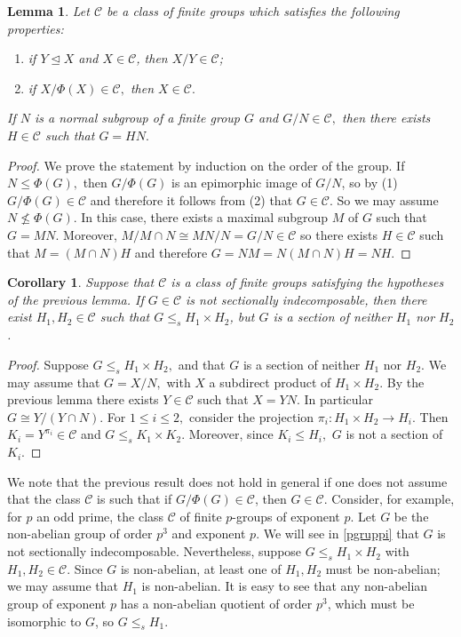 \documentclass[a4paper,10pt]{amsart}
\theoremstyle{plain}
\newtheorem{corollary}[thm]{Corollary}
\newtheorem{lemma}[thm]{Lemma}
\theoremstyle{definition}
\begin{document}
\begin{lemma}\label{class}Let $\mathcal C$ be a class of finite groups which satisfies the following properties:
	\begin{enumerate}
		\item if $Y \unlhd X$ and $X \in \mathcal{C}$, then $X/Y \in \mathcal{C}$;
		\item if $X/\Phi(X)\in \mathcal C,$ then $X\in \mathcal C.$
	\end{enumerate}
	If $N$ is a normal subgroup of a finite group $G$ and $G/N\in \mathcal C,$ then there exists $H\in \mathcal C$ such that $G=HN.$
\end{lemma}
\begin{proof}
	We prove the statement by induction on the order of the group. If $N\leq \Phi(G),$ then $G/\Phi(G)$ is an epimorphic image of $G/N$, so
	by (1) $G/\Phi(G) \in \mathcal C$ and therefore it follows from (2)
	that $G\in \mathcal C.$
	So we may assume $N\not\leq \Phi(G).$ In this case, there exists a maximal subgroup $M$ of $G$ such that $G=MN.$ Moreover, $M/M\cap N \cong MN/N= G/N \in  \mathcal C$ so there exists $H\in \mathcal C$ such that
	$M=(M\cap N)H$ and therefore $G=NM=N(M\cap N)H=NH.$
\end{proof}

\begin{corollary}Suppose that $\mathcal{C}$ is a class of finite groups satisfying the 
hypotheses of the previous lemma. If $G \in \mathcal{C}$ is not sectionally
indecomposable, then there exist $H_1, H_2 \in \mathcal{C}$ such that 
$G \leq_s H_1 \times H_2$, but $G$ is a section of neither $H_1$ nor $H_2$.
\end{corollary}

\begin{proof}Suppose $G\leq_s H_1\times H_2,$ and that $G$ is a section  of neither $H_1$ nor $H_2.$ We may assume that $G=X/N,$ with $X$ a subdirect product of $H_1\times H_2.$ By the previous lemma there exists $Y\in \mathcal C$ such that $X=YN$. In particular $G\cong Y/(Y\cap N).$ For $1\leq i\leq 2,$ consider the projection $\pi_i: H_1\times H_2\to H_i$. Then $K_i=Y^{\pi_i}\in \mathcal C$ and $G\leq_s K_1\times K_2.$ Moreover, since $K_i\leq H_i,$ $G$ is not a section of $K_i.$
\end{proof}

We note that the previous result does not hold in general if one does not assume
that the class $\mathcal{C}$ is such that if $G/\Phi(G) \in \mathcal{C}$,
then $G \in \mathcal{C}$. Consider, for example, for $p$ an odd prime,
the class $\mathcal{C}$ of finite $p$-groups of exponent $p$.
Let $G$ be the non-abelian group of order $p^3$ and exponent $p$.
We will see in \cref{pgruppi} that $G$ is not sectionally indecomposable. Nevertheless, suppose $G \leq_s H_1 \times H_2$ with $H_1, H_2 \in \mathcal{C}$.
Since $G$ is non-abelian, at least one of $H_1, H_2$ must be non-abelian; we may assume that $H_1$ is non-abelian. It is easy to see that any non-abelian group of exponent $p$ has a non-abelian quotient of order $p^3$, which must be isomorphic to $G$, so $G \leq_s H_1$.
\end{document}
